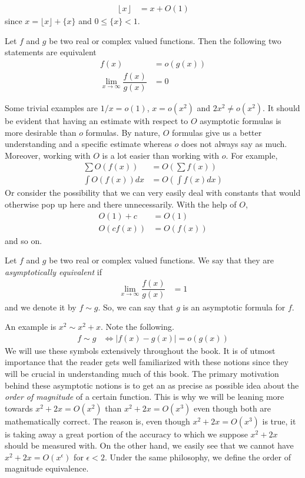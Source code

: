 \documentclass[elemannt.tex]{subfile}
\begin{document}
		\begin{align*}
			\left\lfloor{x}\right\rfloor
				& = x+O(1)
		\end{align*}
	since $x=\lfloor{x}\rfloor+\{x\}$ and $0\leq \{x\}<1$.
		\begin{definition}[Small O]
			Let $f$ and $g$ be two real or complex valued functions. Then the following two statements are equivalent
				\begin{align}
					f(x)
						& = o(g(x))\\
					\lim\limits_{x\to\infty}\dfrac{f(x)}{g(x)}
						& = 0
				\end{align}
		\end{definition}
	Some trivial examples are $1/x=o(1)$, $x=o(x^{2})$ and $2x^{2}\neq o(x^{2})$. It should be evident that having an estimate with respect to $O$ asymptotic formulas is more desirable than $o$ formulas. By nature, $O$ formulas give us a better understanding and a specific estimate whereas $o$ does not always say as much. Moreover, working with $O$ is a lot easier than working with $o$. For example,
		\begin{align*}
			\sum O(f(x))
				& = O\left(\sum f(x)\right)\\
			\int O(f(x))dx
				& = O\left(\int f(x)dx\right)
		\end{align*}
	Or consider the possibility that we can very easily deal with constants that would otherwise pop up here and there unnecessarily. With the help of $O$,
		\begin{align*}
			O(1)+c
				& = O(1)\\
			O(cf(x))
				& = O(f(x))
		\end{align*}
	and so on.
		\begin{definition}[Equivalence]
			Let $f$ and $g$ be two real or complex valued functions. We say that they are \textit{asymptotically equivalent} if
				\begin{align*}
					\lim\limits_{x\to\infty}\dfrac{f(x)}{g(x)}
						& = 1
				\end{align*}
			and we denote it by $f\sim g$. So, we can say that $g$ is an asymptotic formula for $f$.
		\end{definition}
	An example is $x^{2}\sim x^{2}+x$. Note the following.
		\begin{align*}
			f \sim g
				& \iff |f(x)-g(x)|= o(g(x))
		\end{align*}
	We will use these symbols extensively throughout the book. It is of utmost importance that the reader gets well familiarized with these notions since they will be crucial in understanding much of this book. The primary motivation behind these asymptotic notions is to get an as precise as possible idea about the \textit{order of magnitude} of a certain function. This is why we will be leaning more towards $x^{2}+2x=O(x^{2})$ than $x^{2}+2x=O(x^{3})$ even though both are mathematically correct. The reason is, even though $x^{2}+2x=O(x^{3})$ is true, it is taking away a great portion of the accuracy to which we suppose $x^{2}+2x$ should be measured with. On the other hand, we easily see that we cannot have $x^{2}+2x=O(x^{\epsilon})$ for $\epsilon<2$. Under the same philosophy, we define the order of magnitude equivalence.
\end{document}
